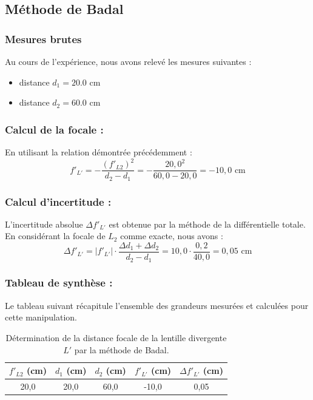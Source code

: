 \subsection{Méthode de Badal}

\subsubsection{Mesures brutes}
Au cours de l'expérience, nous avons relevé les mesures suivantes :
\begin{itemize}
    \item distance $d_1 = 20.0$ cm
    \item distance $d_2 = 60.0$ cm
\end{itemize}

\subsubsection{Calcul de la focale :}
En utilisant la relation démontrée précédemment :
\begin{equation}
    f'_{L'} = -\frac{(f'_{L2})^2}{d_2 - d_1} = -\frac{20,0^2}{60,0 - 20,0} = -10,0 \text{ cm}
\end{equation}

\subsubsection{Calcul d'incertitude :}
L'incertitude absolue $\Delta f'_{L'}$ est obtenue par la méthode de la différentielle totale. En considérant la focale de $L_2$ comme exacte, nous avons :
\begin{equation}
    \Delta f'_{L'} = |f'_{L'}| \cdot \frac{\Delta d_1 + \Delta d_2}{d_2 - d_1} = 10,0 \cdot \frac{0,2}{40,0} = 0,05 \text{ cm}
\end{equation}

\subsubsection{Tableau de synthèse :}
Le tableau suivant récapitule l'ensemble des grandeurs mesurées et calculées pour cette manipulation.

\begin{table}[h!]
    \centering
    \begin{tabular}{|c|c|c|c|c|}
        \hline
        $f'_{L2}$ (cm) & $d_1$ (cm) & $d_2$ (cm) & $f'_{L'}$ (cm) & $\Delta f'_{L'}$ (cm) \\
        \hline
        20,0 & 20,0 & 60,0 & -10,0 & 0,05 \\
        \hline
    \end{tabular}
    \caption{Détermination de la distance focale de la lentille divergente $L'$ par la méthode de Badal.}
\end{table}

